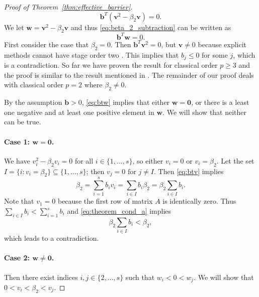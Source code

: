 \begin{proof}[Proof of Theorem~\ref{thm:effective_barrier}]
\begin{equation}
		\bm{b}^T(\bm{v}^2 - \beta_2\bm{v}) = 0.
	\end{equation}
	We let
		$\bm{w} = \bm{v}^{2} - \beta_{2}\bm{v}$
	and thus \eqref{eq:beta_2_subtraction} can be written as 
	\begin{equation}\label{eq:btw}
		\bm{b}^T\bm{w} = 0.
	\end{equation}
	First consider the case that $\beta_2 = 0$. 
	Then $\bm{b}^T\bm{v}^2 = 0$, but $\bm{v }\neq 0$ because explicit methods
	cannot have stage order two \cite{Ruuth2002}. This implies that $b_j \leq 0$ 
	for some $j$, which is a contradiction.
        So far we have proven the result for classical order $p \ge 3$
        and the proof is similar to the result mentioned in \cite{Ruuth2002}.
        The remainder of our proof deals with classical order $p=2$
        where $\beta_2 \neq 0$.


	By the assumption $\bm{b}>0$, \eqref{eq:btw} implies that either
	$\bm{w} = \bm{0}$, or there is a least one negative and at least one positive 
	element in $\bm{w}$.
	We will show that neither can be true.

	\paragraph{Case 1: $\bm{w} = \bm{0}$.}
	We have $v_i^2 - \beta_2 v_i = 0$ for all $i \in \{1, \dots, s\}$, so either 
	$v_i = 0$ or $v_i = \beta_2$.
	Let the set $I = \{i : v_i = \beta_2\} \subseteq \{1, \dots, s\}$; then 
	$v_j = 0$ for $j \neq I$.
	Then \eqref{eq:btv} implies 
	\begin{equation*}
		\beta_2 = \sum_{i=1}^s b_i v_i = \sum_{i \in I}b_i\beta_2 = \beta_2\sum_{i \in I}b_i.
	\end{equation*}
	Note that $v_1 = 0$ because the first row of matrix $A$ is identically zero. 
	Thus $\sum_{i\in I}b_i < \sum_{i=1}^s b_i$ and \eqref{eq:theorem_cond_a} 
	implies
	\begin{equation*}
		\beta_2\sum_{i \in I}b_i< \beta_2,
	\end{equation*} 
	which leads to a contradiction.

	\paragraph{Case 2: $\bm{w} \neq \bm{0}$.}
	Then there exist indices $i, j \in \{2, \dots, s\}$ such that $w_i < 0 < w_j$.
	We will show that $0 < v_i < \beta_2 < v_j$.


\end{proof}

